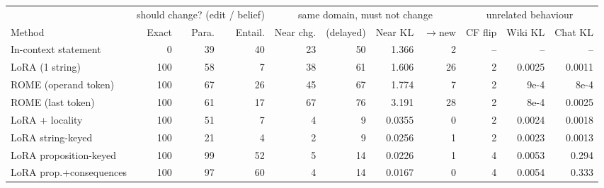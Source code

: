 \begin{tabular}{lrrrrrrrrrr}
\toprule
 & \multicolumn{3}{c}{should change? (edit / belief)} & \multicolumn{4}{c}{same domain, must not change} & \multicolumn{3}{c}{unrelated behaviour} \\
\cmidrule(lr){2-4}\cmidrule(lr){5-8}\cmidrule(lr){9-11}
Method & Exact & Para. & Entail. & Near chg. & (delayed) & Near KL & $\to$new & CF flip & Wiki KL & Chat KL \\
\midrule
In-context statement & 0 & 39 & 40 & 23 & 50 & 1.366 & 2 & -- & -- & -- \\
\addlinespace[2pt]
LoRA (1 string) & 100 & 58 & 7 & 38 & 61 & 1.606 & 26 & 2 & 0.0025 & 0.0011 \\
ROME (operand token) & 100 & 67 & 26 & 45 & 67 & 1.774 & 7 & 2 & 9e-4 & 8e-4 \\
ROME (last token) & 100 & 61 & 17 & 67 & 76 & 3.191 & 28 & 2 & 8e-4 & 0.0025 \\
\addlinespace[2pt]
LoRA + locality & 100 & 51 & 7 & 4 & 9 & 0.0355 & 0 & 2 & 0.0024 & 0.0018 \\
\addlinespace[2pt]
LoRA string-keyed & 100 & 21 & 4 & 2 & 9 & 0.0256 & 1 & 2 & 0.0023 & 0.0013 \\
\addlinespace[2pt]
LoRA proposition-keyed & 100 & 99 & 52 & 5 & 14 & 0.0226 & 1 & 4 & 0.0053 & 0.294 \\
\addlinespace[2pt]
LoRA prop.+consequences & 100 & 97 & 60 & 4 & 14 & 0.0167 & 0 & 4 & 0.0054 & 0.333 \\
\bottomrule
\end{tabular}
